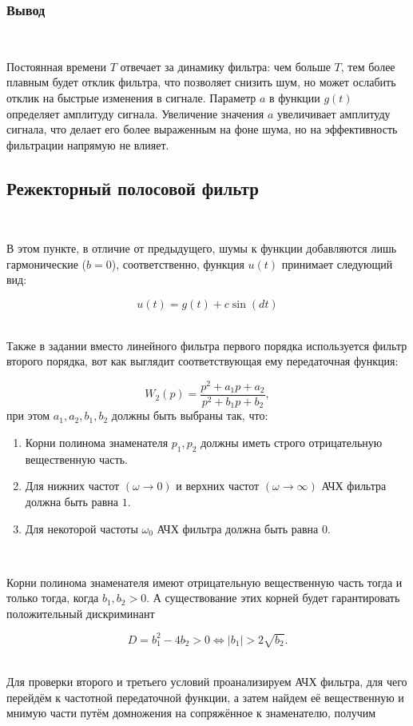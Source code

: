 \documentclass[a4paper]{article}
\begin{document}
\subsubsection{Вывод}\

Постоянная времени $T$ отвечает за динамику фильтра: чем больше $T$, тем более плавным будет отклик фильтра, что позволяет снизить шум, но может ослабить отклик на быстрые изменения в сигнале. Параметр $a$ в функции $g(t)$ определяет амплитуду сигнала. Увеличение значения $a$ увеличивает амплитуду сигнала, что делает его более выраженным на фоне шума, но на эффективность фильтрации напрямую не влияет.

\subsection{Режекторный полосовой фильтр}\

В этом пункте, в отличие от предыдущего, шумы к функции добавляются лишь гармонические ($b = 0$), соответственно, функция $u(t)$ принимает следующий вид:

$$
u(t) = g(t) + c\sin{(dt)}
$$\ 

Также в задании вместо линейного фильтра первого порядка используется фильтр второго порядка, вот как выглядит соответствующая ему передаточная функция:

$$
W_2(p) = \frac{p^2 + a_1p + a_2}{p^2 + b_1p + b_2},
$$
при этом $a_1, a_2, b_1, b_2$ должны быть выбраны так, что:

\begin{enumerate}
    \item Корни полинома знаменателя $p_1, p_2$ должны иметь строго отрицательную вещественную часть.
    \item Для нижних частот $(\omega \to 0)$ и верхних частот $(\omega \to \infty)$ АЧХ фильтра должна быть равна $1$.
    \item Для некоторой частоты $\omega_0$ АЧХ фильтра должна быть равна $0$.
\end{enumerate}\

Корни полинома знаменателя имеют отрицательную вещественную часть тогда и только тогда, когда $b_1, b_2 > 0$. А существование этих корней будет гарантировать положительный дискриминант

$$D = b_1^2-4b_2 > 0 \Leftrightarrow |b_1| > 2 \sqrt{b_2}.$$\ 

Для проверки второго и третьего условий проанализируем АЧХ фильтра, для чего перейдём к частотной передаточной функции, а затем найдем её вещественную и мнимую части путём домножения на сопряжённое к знаменателю, получим
\end{document}

